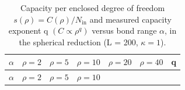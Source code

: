 \documentclass[12pt]{iopart}
\begin{document}
\begin{longtable}[]{@{}
  >{\raggedright\arraybackslash}p{}
  >{\raggedright\arraybackslash}p{}
  >{\raggedright\arraybackslash}p{}
  >{\raggedright\arraybackslash}p{}
  >{\raggedright\arraybackslash}p{}
  >{\raggedright\arraybackslash}p{}
  >{\raggedright\arraybackslash}p{}@{}}
\caption{Capacity per enclosed degree of freedom
\(s(\rho ) = C(\rho )/N_{\mathrm{in}}\) and measured capacity exponent q
\((C \propto  \rho ^{q})\) versus bond range \(\alpha\), in the
spherical reduction (L = 200, \(\kappa  = 1\)).}\tabularnewline
\toprule\noalign{}
\begin{minipage}[b]{\linewidth}\raggedright
\(\alpha\)
\end{minipage} & \begin{minipage}[b]{\linewidth}\raggedright
\(\rho =2\)
\end{minipage} & \begin{minipage}[b]{\linewidth}\raggedright
\(\rho =5\)
\end{minipage} & \begin{minipage}[b]{\linewidth}\raggedright
\(\rho =10\)
\end{minipage} & \begin{minipage}[b]{\linewidth}\raggedright
\(\rho =20\)
\end{minipage} & \begin{minipage}[b]{\linewidth}\raggedright
\(\rho =40\)
\end{minipage} & \begin{minipage}[b]{\linewidth}\raggedright
q
\end{minipage} \\
\midrule\noalign{}
\endfirsthead
\toprule\noalign{}
\begin{minipage}[b]{\linewidth}\raggedright
\(\alpha\)
\end{minipage} & \begin{minipage}[b]{\linewidth}\raggedright
\(\rho =2\)
\end{minipage} & \begin{minipage}[b]{\linewidth}\raggedright
\(\rho =5\)
\end{minipage} & \begin{minipage}[b]{\linewidth}\raggedright
\(\rho =10\)

\end{minipage}
\end{longtable}
\end{document}
